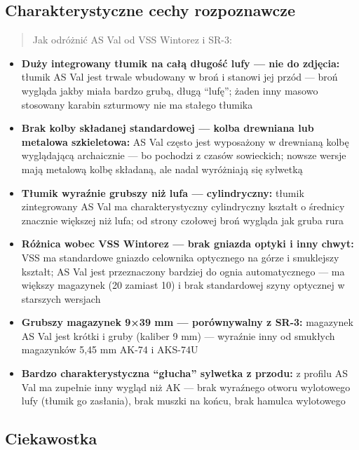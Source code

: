 \documentclass[12pt,oneside]{book}
\providecommand{\tightlist}{%
  \setlength{\itemsep}{0pt}\setlength{\parskip}{0pt}}
\begin{document}
\subsection{Charakterystyczne cechy
rozpoznawcze}\label{charakterystyczne-cechy-rozpoznawcze-68}

\begin{quote}
Jak odróżnić AS Val od VSS Wintorez i SR-3:
\end{quote}

\begin{itemize}
\tightlist
\item
  \textbf{Duży integrowany tłumik na całą długość lufy --- nie do
  zdjęcia:} tłumik AS Val jest trwale wbudowany w broń i stanowi jej
  przód --- broń wygląda jakby miała bardzo grubą, długą ``lufę''; żaden
  inny masowo stosowany karabin szturmowy nie ma stałego tłumika
\item
  \textbf{Brak kolby składanej standardowej --- kolba drewniana lub
  metalowa szkieletowa:} AS Val często jest wyposażony w drewnianą kolbę
  wyglądającą archaicznie --- bo pochodzi z czasów sowieckich; nowsze
  wersje mają metalową kolbę składaną, ale nadal wyróżniają się sylwetką
\item
  \textbf{Tłumik wyraźnie grubszy niż lufa --- cylindryczny:} tłumik
  zintegrowany AS Val ma charakterystyczny cylindryczny kształt o
  średnicy znacznie większej niż lufa; od strony czołowej broń wygląda
  jak gruba rura
\item
  \textbf{Różnica wobec VSS Wintorez --- brak gniazda optyki i inny
  chwyt:} VSS ma standardowe gniazdo celownika optycznego na górze i
  smuklejszy kształt; AS Val jest przeznaczony bardziej do ognia
  automatycznego --- ma większy magazynek (20 zamiast 10) i brak
  standardowej szyny optycznej w starszych wersjach
\item
  \textbf{Grubszy magazynek 9×39 mm --- porównywalny z SR-3:} magazynek
  AS Val jest krótki i gruby (kaliber 9 mm) --- wyraźnie inny od
  smukłych magazynków 5,45 mm AK-74 i AKS-74U
\item
  \textbf{Bardzo charakterystyczna ``głucha'' sylwetka z przodu:} z
  profilu AS Val ma zupełnie inny wygląd niż AK --- brak wyraźnego
  otworu wylotowego lufy (tłumik go zasłania), brak muszki na końcu,
  brak hamulca wylotowego
\end{itemize}

\subsection{Ciekawostka}\label{ciekawostka-68}
\end{document}
